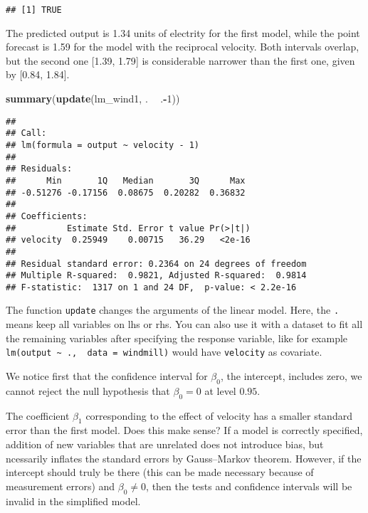 \documentclass[]{book}
\newenvironment{Shaded}{\begin{snugshade}}{\end{snugshade}}
\newcommand{\DecValTok}[1]{\textcolor[rgb]{0.00,0.00,0.81}{#1}}
\newcommand{\KeywordTok}[1]{\textcolor[rgb]{0.13,0.29,0.53}{\textbf{#1}}}
\newcommand{\NormalTok}[1]{#1}
\newcommand{\OperatorTok}[1]{\textcolor[rgb]{0.81,0.36,0.00}{\textbf{#1}}}
\newcommand{\StringTok}[1]{\textcolor[rgb]{0.31,0.60,0.02}{#1}}
\theoremstyle{definition}
\theoremstyle{definition}
\theoremstyle{definition}
\theoremstyle{remark}
\begin{document}
\begin{verbatim}
## [1] TRUE
\end{verbatim}

The predicted output is 1.34 units of electrity for the first model, while the point forecast is 1.59 for the model with the reciprocal velocity. Both intervals overlap, but the second one {[}1.39, 1.79{]} is considerable narrower than the first one, given by {[}0.84, 1.84{]}.

\begin{Shaded}
\begin{Highlighting}[]
\KeywordTok{summary}\NormalTok{(}\KeywordTok{update}\NormalTok{(lm_wind1, . }\OperatorTok{~}\StringTok{ }\NormalTok{.}\OperatorTok{-}\DecValTok{1}\NormalTok{))}
\end{Highlighting}
\end{Shaded}

\begin{verbatim}
## 
## Call:
## lm(formula = output ~ velocity - 1)
## 
## Residuals:
##      Min       1Q   Median       3Q      Max 
## -0.51276 -0.17156  0.08675  0.20282  0.36832 
## 
## Coefficients:
##          Estimate Std. Error t value Pr(>|t|)
## velocity  0.25949    0.00715   36.29   <2e-16
## 
## Residual standard error: 0.2364 on 24 degrees of freedom
## Multiple R-squared:  0.9821, Adjusted R-squared:  0.9814 
## F-statistic:  1317 on 1 and 24 DF,  p-value: < 2.2e-16
\end{verbatim}

The function \texttt{update} changes the arguments of the linear model. Here, the \texttt{.} means keep all variables on lhs or rhs. You can also use it with a dataset to fit all the remaining variables after specifying the response variable, like for example \texttt{lm(output\ \textasciitilde{}\ .,\ \ data\ =\ windmill)} would have \texttt{velocity} as covariate.

We notice first that the confidence interval for \(\beta_0\), the intercept, includes zero, we cannot reject the null hypothesis that \(\beta_0=0\) at level \(0.95\).

The coefficient \(\beta_1\) corresponding to the effect of velocity has a smaller standard error than the first model. Does this make sense? If a model is correctly specified, addition of new variables that are unrelated does not introduce bias, but ncessarily inflates the standard errors by Gauss--Markov theorem. However, if the intercept should truly be there (this can be made necessary because of measurement errors) and \(\beta_0 \neq 0\), then the tests and confidence intervals will be invalid in the simplified model.
\end{document}
